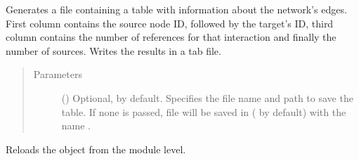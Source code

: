 \documentclass[letterpaper,10pt,english]{sphinxmanual}
\begin{document}
\begin{fulllineitems}
\begin{fulllineitems}
\end{fulllineitems}


\begin{fulllineitems}
\label{\detokenize{reference:pypath.main.PyPath.reference_hist}}
Generates a file containing a table with information about the
network’s edges. First column contains the source node ID,
followed by the target’s ID, third column contains the number of
references for that interaction and finally the number of
sources. Writes the results in a tab file.
\begin{quote}\begin{description}
\item[{Parameters}] \leavevmode
{} () \textendash{} Optional,  by default. Specifies the file name and
path to save the table. If none is passed, file will be
saved in  (
by default) with the name .

\end{description}\end{quote}

\end{fulllineitems}


\begin{fulllineitems}
\label{\detokenize{reference:pypath.main.PyPath.reload}}
Reloads the object from the module level.

\end{fulllineitems}


\begin{fulllineitems}
\label{\detokenize{reference:pypath.main.PyPath.remove_htp}}
\end{fulllineitems}


\end{fulllineitems}
\end{document}
